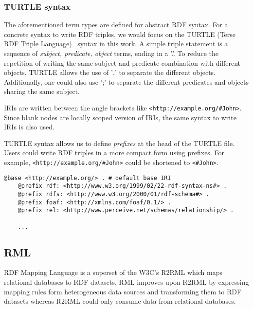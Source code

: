 \subsubsection*{TURTLE syntax}
The aforementioned term types are defined for abstract RDF syntax. For a concrete syntax to write
RDF triples, we would focus on the TURTLE (Terse RDF Triple Language)~\cite{turtle_syntax}
syntax in this work. A simple triple statement is a sequence of
\textit{subject, predicate, object} terms, ending in a '.'.
To reduce the repetition of writing the same subject and predicate combination with
different objects, TURTLE allows the use of ',' to separate the different objects.
Additionally, one could also use ';' to separate the different predicates and objects sharing the
same subject.

IRIs are written between the angle brackets like \lstinline{<http://example.org/#John>}.
Since blank nodes are locally scoped version of IRIs, the same syntax to write IRIs is also used.





TURTLE syntax allows us to define \textit{prefixes} at the head of the TURTLE file.
Users could write RDF triples in a more compact form using prefixes. For example,
\lstinline{<http://example.org/#John>} could be shortened to
\lstinline{<#John>}.

\begin{lstlisting}[caption=Prefixes in TURTLE syntax.]
    @base <http://example.org/> . # default base IRI
    @prefix rdf: <http://www.w3.org/1999/02/22-rdf-syntax-ns#> .
    @prefix rdfs: <http://www.w3.org/2000/01/rdf-schema#> .
    @prefix foaf: <http://xmlns.com/foaf/0.1/> .
    @prefix rel: <http://www.perceive.net/schemas/relationship/> . 
    
    ... 
\end{lstlisting}



\subsection{RML}
RDF Mapping Language\cite{rml} is a superset of the W3C's R2RML which maps relational databases to
RDF datasets. RML improves upon R2RML by expressing mapping rules form heterogeneous
data sources and transforming them to RDF datasets whereas R2RML could only consume
data from relational databases.


